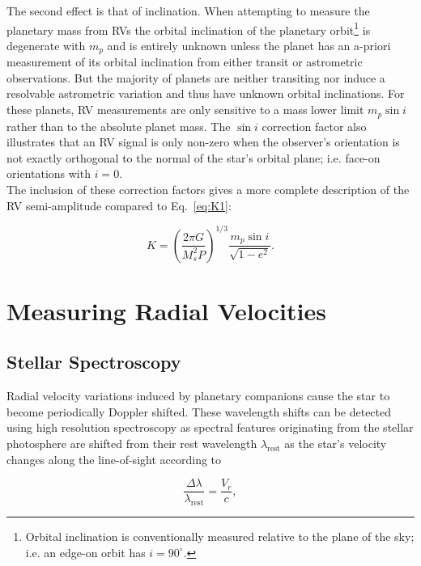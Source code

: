 The second effect is that of inclination. When attempting to measure the planetary 
mass from RVs the orbital inclination of the planetary orbit\footnote{Orbital 
inclination is conventionally measured  relative 
to the plane of the sky; i.e. an edge-on orbit has $i=90^{\circ}$.} is degenerate with
$m_p$ and is entirely unknown unless the planet has an a-priori measurement of its orbital
inclination from either transit or astrometric observations. But the majority of planets are
neither transiting nor induce a resolvable astrometric variation and thus have unknown
orbital inclinations. For these planets, RV measurements 
are only sensitive to a mass lower limit $m_p\sin{i}$ rather than to the absolute planet mass.
The $\sin{i}$ correction factor also illustrates that an RV signal is only non-zero when
the observer's orientation is not exactly orthogonal to the normal of the star's orbital plane;
i.e. face-on orientations with $i=0$. \\

The inclusion of these correction factors gives a more complete description of the RV semi-amplitude
compared to Eq.~\ref{eq:K1}: 

\begin{equation}
K = \left( \frac{2\pi G}{M_s^2 P} \right)^{1/3} \frac{m_p \sin{i}}{\sqrt{1-e^2}}. 
\label{eq:K2}
\end{equation}

\section{Measuring Radial Velocities} \label{sect:spectrograph}
\subsection{Stellar Spectroscopy}
Radial velocity variations induced by planetary companions cause the star to become 
periodically Doppler shifted. These wavelength shifts can be detected using high resolution 
spectroscopy as spectral features originating from the stellar photosphere are shifted from
their rest wavelength $\lambda_{\text{rest}}$ as the star's velocity changes along the
line-of-sight according to 

\begin{equation}
\frac{\Delta \lambda}{\lambda_{\text{rest}}} = \frac{V_r}{c},
\end{equation}

